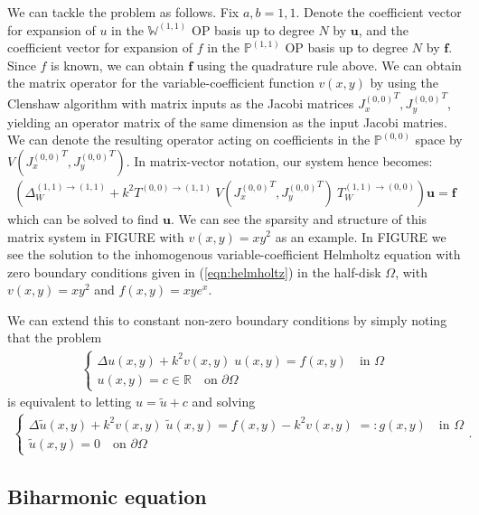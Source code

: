\documentclass[11pt, oneside]{article}   	%
\newcommand{\R}{\mathbb{R}}
\newcommand{\bigPii}{{\mathbb{P}^{(1,1)}}}
\newcommand{\bigPoo}{{\mathbb{P}^{(0,0)}}}
\newcommand{\laplacewii}{\Delta_W^{(1,1)\to(1,1)}}
\newcommand{\bigWii}{{\mathbb{W}^{(1,1)}}}
\begin{document}
We can tackle the problem as follows. Fix \(a, b = 1,1\). Denote the coefficient vector for expansion of $u$ in the $\bigWii$ OP basis up to degree $N$ by $\mathbf{u}$, and the coefficient vector for expansion of $f$ in the $\bigPii$ OP basis up to degree $N$ by $\mathbf{f}$. Since $f$ is known, we can obtain $\mathbf{f}$ using the quadrature rule above. We can obtain the matrix operator for the variable-coefficient function $v(x,y)$ by using the Clenshaw algorithm with matrix inputs as the Jacobi matrices ${J_x^{(0,0)}}^T, {J_y^{(0,0)}}^T$, yielding an operator matrix of the same dimension as the input Jacobi matries. We can denote the resulting operator acting on coefficients in the $\bigPoo$ space by $V({J_x^{(0,0)}}^T, {J_y^{(0,0)}}^T)$. In matrix-vector notation, our system hence becomes:
\begin{align}
    (\laplacewii + k^2 T^{(0,0)\to(1,1)} \: V({J_x^{(0,0)}}^T, {J_y^{(0,0)}}^T) \: T_W^{(1,1)\to(0,0)}) \mathbf{u} = \mathbf{f}
\end{align}
which can be solved to find $\mathbf{u}$. We can see the sparsity and structure of this matrix system in FIGURE with $v(x,y) = xy^2$ as an example. In FIGURE we see the solution to the inhomogenous variable-coefficient Helmholtz equation with zero boundary conditions given in (\ref{eqn:helmholtz}) in the half-disk $\Omega$, with  $v(x,y) = xy^2$ and $f(x,y) = xy e^x$.

We can extend this to constant non-zero boundary conditions by simply noting that the problem 
\begin{align}
	\begin{cases}
    		\Delta u(x,y) + k^2 v(x,y) \; u(x,y) = f(x,y) \quad \text{in } \Omega \\
		u(x,y) = c \in \R \quad \text{on } \partial \Omega
	\end{cases}
\end{align}
is equivalent to letting $u = \tilde{u} + c$ and solving
\begin{align}
	\begin{cases}
    		\Delta \tilde{u}(x,y) + k^2 v(x,y) \; \tilde{u}(x,y) = f(x,y) - k^2 v(x,y) \; =: g(x,y)  \quad \text{in } \Omega \\
		\tilde{u}(x,y) = 0 \quad \text{on } \partial \Omega
	\end{cases}.
\end{align}


\subsection{Biharmonic equation}
\end{document}
